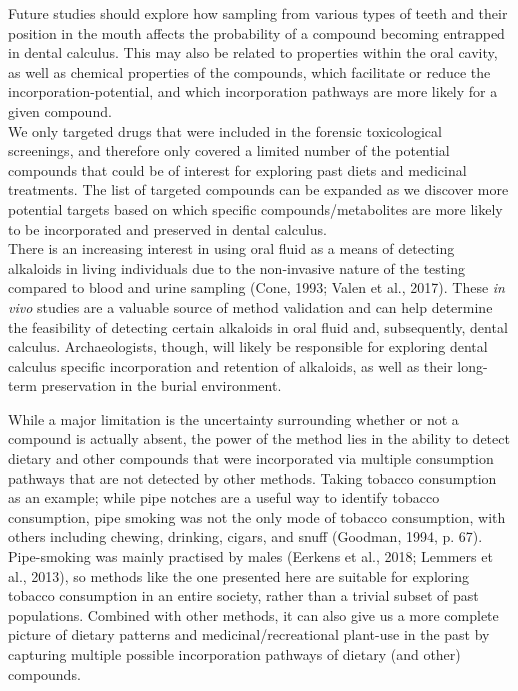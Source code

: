 \documentclass[
  letterpaper,
]{book}
\begin{document}
Future studies should explore how sampling from various types of teeth
and their position in the mouth affects the probability of a compound
becoming entrapped in dental calculus. This may also be related to
properties within the oral cavity, as well as chemical properties of the
compounds, which facilitate or reduce the incorporation-potential, and
which incorporation pathways are more likely for a given compound.\\
We only targeted drugs that were included in the forensic toxicological
screenings, and therefore only covered a limited number of the potential
compounds that could be of interest for exploring past diets and
medicinal treatments. The list of targeted compounds can be expanded as
we discover more potential targets based on which specific
compounds/metabolites are more likely to be incorporated and preserved
in dental calculus.\\
There is an increasing interest in using oral fluid as a means of
detecting alkaloids in living individuals due to the non-invasive nature
of the testing compared to blood and urine sampling (Cone, 1993; Valen
et al., 2017). These \emph{in vivo} studies are a valuable source of
method validation and can help determine the feasibility of detecting
certain alkaloids in oral fluid and, subsequently, dental calculus.
Archaeologists, though, will likely be responsible for exploring dental
calculus specific incorporation and retention of alkaloids, as well as
their long-term preservation in the burial environment.

While a major limitation is the uncertainty surrounding whether or not a
compound is actually absent, the power of the method lies in the ability
to detect dietary and other compounds that were incorporated via
multiple consumption pathways that are not detected by other methods.
Taking tobacco consumption as an example; while pipe notches are a
useful way to identify tobacco consumption, pipe smoking was not the
only mode of tobacco consumption, with others including chewing,
drinking, cigars, and snuff (Goodman, 1994, p. 67). Pipe-smoking was
mainly practised by males (Eerkens et al., 2018; Lemmers et al., 2013),
so methods like the one presented here are suitable for exploring
tobacco consumption in an entire society, rather than a trivial subset
of past populations. Combined with other methods, it can also give us a
more complete picture of dietary patterns and medicinal/recreational
plant-use in the past by capturing multiple possible incorporation
pathways of dietary (and other) compounds.
\end{document}
